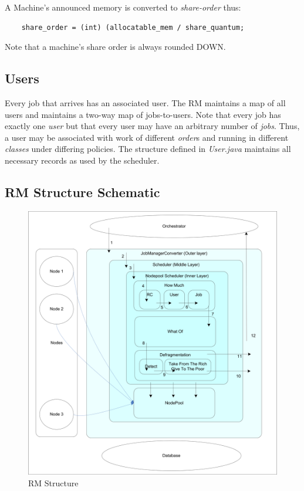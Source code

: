     A Machine's announced memory is converted to {\em share-order} thus:
\begin{verbatim}
    share_order = (int) (allocatable_mem / share_quantum;
\end{verbatim}
    Note that a machine's share order is always rounded DOWN.

\subsection{Users}
    Every job that arrives has an associated user.  The RM maintains a map of all users and
    maintains a two-way map of jobs-to-users.  Note that every job has exactly one {\em user} 
    but that every user may have an arbitrary number of {\em jobs}.  Thus, a user may
    be associated with work of different {\em order}s and running in different {\em classes}
    under differing policies.  The structure defined in {\em User.java} maintains all
    necessary records as used by the scheduler.

\subsection{RM Structure Schematic}
    \begin{figure}[H]
      \centering
      \includegraphics[width=5.5in]{images/ducc-internals/rm-structure.png}
      \caption{RM Structure}
      \label{fig:rm-structure}
    \end{figure}

